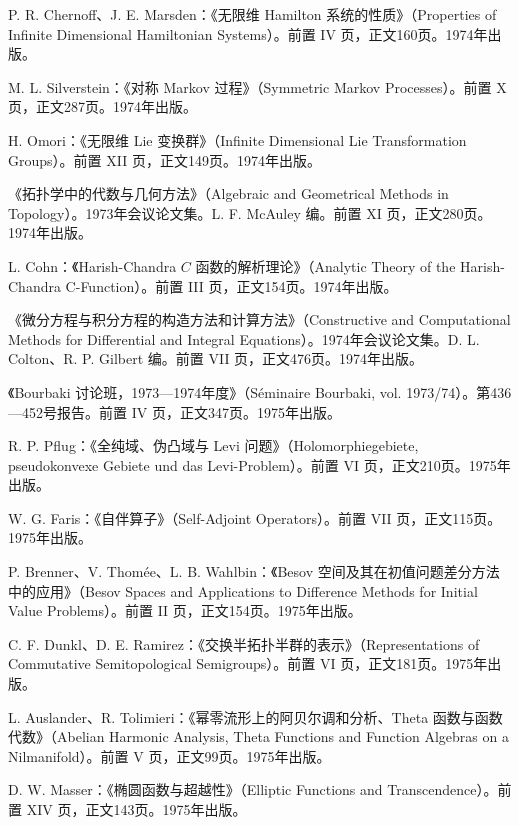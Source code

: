 \begin{description}[style=nextline,leftmargin=1.5em,itemsep=7pt]
\item[第425卷] P. R. Chernoff、J. E. Marsden：《无限维 Hamilton 系统的性质》（Properties of Infinite Dimensional Hamiltonian Systems）。前置 IV 页，正文160页。1974年出版。
\item[第426卷] M. L. Silverstein：《对称 Markov 过程》（Symmetric Markov Processes）。前置 X 页，正文287页。1974年出版。
\item[第427卷] H. Omori：《无限维 Lie 变换群》（Infinite Dimensional Lie Transformation Groups）。前置 XII 页，正文149页。1974年出版。
\item[第428卷]《拓扑学中的代数与几何方法》（Algebraic and Geometrical Methods in Topology）。1973年会议论文集。L. F. McAuley 编。前置 XI 页，正文280页。1974年出版。
\item[第429卷] L. Cohn：《Harish-Chandra $C$ 函数的解析理论》（Analytic Theory of the Harish-Chandra C-Function）。前置 III 页，正文154页。1974年出版。
\item[第430卷]《微分方程与积分方程的构造方法和计算方法》（Constructive and Computational Methods for Differential and Integral Equations）。1974年会议论文集。D. L. Colton、R. P. Gilbert 编。前置 VII 页，正文476页。1974年出版。
\item[第431卷]《Bourbaki 讨论班，1973—1974年度》（Séminaire Bourbaki, vol. 1973/74）。第436—452号报告。前置 IV 页，正文347页。1975年出版。
\item[第432卷] R. P. Pflug：《全纯域、伪凸域与 Levi 问题》（Holomorphiegebiete, pseudokonvexe Gebiete und das Levi-Problem）。前置 VI 页，正文210页。1975年出版。
\item[第433卷] W. G. Faris：《自伴算子》（Self-Adjoint Operators）。前置 VII 页，正文115页。1975年出版。
\item[第434卷] P. Brenner、V. Thomée、L. B. Wahlbin：《Besov 空间及其在初值问题差分方法中的应用》（Besov Spaces and Applications to Difference Methods for Initial Value Problems）。前置 II 页，正文154页。1975年出版。
\item[第435卷] C. F. Dunkl、D. E. Ramirez：《交换半拓扑半群的表示》（Representations of Commutative Semitopological Semigroups）。前置 VI 页，正文181页。1975年出版。
\item[第436卷] L. Auslander、R. Tolimieri：《幂零流形上的阿贝尔调和分析、Theta 函数与函数代数》（Abelian Harmonic Analysis, Theta Functions and Function Algebras on a Nilmanifold）。前置 V 页，正文99页。1975年出版。
\item[第437卷] D. W. Masser：《椭圆函数与超越性》（Elliptic Functions and Transcendence）。前置 XIV 页，正文143页。1975年出版。

\end{description}
